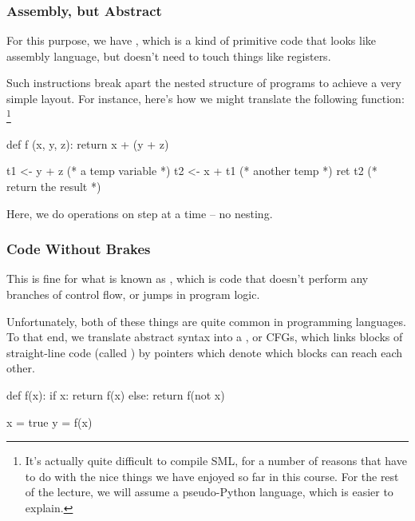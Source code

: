 \documentclass[aspectratio=169]{beamer}
\begin{document}
\begin{frame}[fragile]
  \frametitle{Assembly, but Abstract}

  For this purpose, we have , which is a kind of
  primitive code that looks like assembly language, but doesn't need to
  touch things like registers.

  \pause
  \vspace{\fill}

  Such instructions break apart the nested structure of programs to achieve
  a very simple layout. For instance, here's how we might translate the following function:
  \footnote{It's actually quite difficult to compile SML, for a number of reasons
  that have to do with the nice things we have enjoyed so far in this course. For
  the rest of the lecture, we will assume a pseudo-Python language, which is easier
  to explain.}
  \begin{pythoncodeblock}
    def f (x, y, z):
      return x + (y + z)
  \end{pythoncodeblock}

  \pause
  \vspace{\fill}

  \begin{codeblock}
    t1 <- y + z   (* a temp variable *)
    t2 <- x + t1  (* another temp *)
    ret t2        (* return the result *)
  \end{codeblock}

  \pause
  \vspace{\fill}

  Here, we do operations on step at a time -- no nesting.
\end{frame}

\begin{frame}[fragile]
  \frametitle{Code Without Brakes}

  This is fine for what is known as , which is code
  that doesn't perform any branches of control flow, or jumps in program logic.

  \pause
  \vspace{\fill}

  Unfortunately, both of these things are quite common in programming languages.
  To that end, we translate abstract syntax into a ,
  or CFGs, which links blocks of straight-line code (called )
  by pointers which denote which blocks can reach each other.
  \begin{pythoncodeblock}
    def f(x):
      if x:
        return f(x)
      else:
        return f(not x)

    x = true
    y = f(x)
  \end{pythoncodeblock}
\end{frame}
\end{document}
